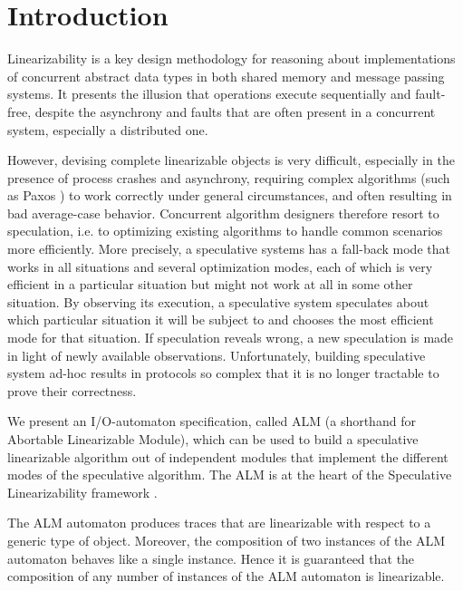 \section{Introduction}

Linearizability \cite{HerlihyWing90Linearizability} is a  key design  methodology  for reasoning
about implementations of concurrent abstract data types in both shared
memory  and message passing  systems.  It  presents the  illusion that
operations execute sequentially and fault-free, despite the asynchrony
and faults that are often present in a concurrent system, especially a
distributed one.

However,  devising complete  linearizable objects  is  very difficult,
especially  in  the presence  of  process  crashes and asynchrony, requiring  complex
algorithms   (such  as   Paxos \cite{Lamport98PartTimeParliament})  to   work  correctly   under  general
circumstances,  and  often  resulting  in bad  average-case  behavior.
Concurrent algorithm designers therefore resort to speculation, i.e. to optimizing existing
algorithms to handle common scenarios more efficiently.
More precisely, a speculative systems has a fall-back mode that works in all situations and several optimization modes, each of which is very efficient in a particular situation but might not work at all in some other situation. By observing its execution, a speculative system speculates about which particular situation it will be subject to and chooses the most efficient mode for that situation. If speculation reveals wrong, a new speculation is made in light of newly available observations.
Unfortunately, building speculative system ad-hoc results in protocols so complex that it is no longer
tractable to prove their correctness.

We present  an I/O-automaton \cite{Lynch89anintroduction} specification, called ALM (a shorthand for Abortable Linearizable Module), which can be
used to build a speculative linearizable algorithm out of independent modules that implement the different modes of the speculative algorithm. The ALM is at the heart of the Speculative Linearizability framework \cite{GKL2012SpeculativeLinearizability}.

The ALM automaton produces traces that are linearizable with respect to
a generic type of object.  Moreover,  the composition of two instances of
the  ALM  automaton behaves  like  a  single  instance.  Hence  it  is
guaranteed that the composition of  any number of instances of the ALM
automaton is linearizable.

